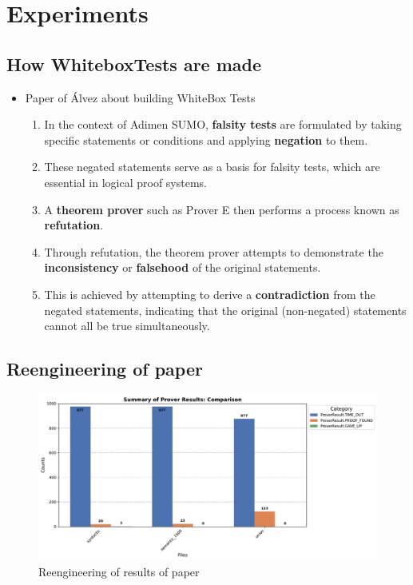 \documentclass[english,version-2020-11]{uzl-thesis}
\begin{document}
\chapter{Experiments}
    \section{How WhiteboxTests are made}
      \begin{itemize}
        \item Paper of Álvez about building WhiteBox Tests \cite{Álvez2017}
        \begin{enumerate}
          \item In the context of Adimen SUMO, \textbf{falsity tests} are formulated by taking specific statements or conditions and applying \textbf{negation} to them.
          \item These negated statements serve as a basis for falsity tests, which are essential in logical proof systems.
          \item A \textbf{theorem prover} such as Prover E then performs a process known as \textbf{refutation}.
          \item Through refutation, the theorem prover attempts to demonstrate the \textbf{inconsistency} or \textbf{falsehood} of the original statements.
          \item This is achieved by attempting to derive a \textbf{contradiction} from the negated statements, indicating that the original (non-negated) statements cannot all be true simultaneously.
        \end{enumerate}
      \end{itemize}
    \section{Reengineering of paper \cite{Schon2024}}
      \begin{figure}[h!]
        \centering
        \includegraphics[width=\textwidth]{standard_mode_noAdded_output.pdf} %
        \caption{Reengineering of results of paper \cite{Schon2024}}
        \label{fig:reengineering}
      \end{figure}
      \clearpage
\end{document}
